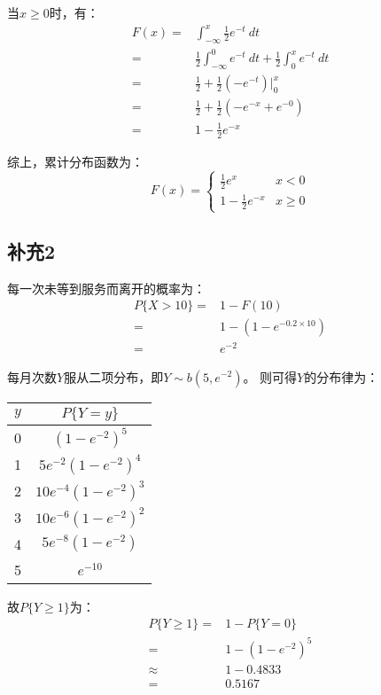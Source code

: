 \documentclass[a4paper,12pt]{ctexart}
\begin{document}
当$x \geq 0$时，有：
\begin{align*}
	F(x) =& \int_{-\infty}^{x} \frac{1}{2} e^{-t}\ dt\\
	=& \frac{1}{2} \int_{-\infty}^{0} e^{-t}\ dt + \frac{1}{2} \int_{0}^{x} e^{-t}\ dt\\
	=& \frac{1}{2} + \frac{1}{2} \left(-e^{-t}\right) \Big|_{0}^{x}\\
	=& \frac{1}{2} + \frac{1}{2} (-e^{-x} + e^{-0})\\
	=& 1 - \frac{1}{2} e^{-x}
\end{align*}

综上，累计分布函数为：
\begin{equation*}
	F(x) = \begin{cases}
		\frac{1}{2} e^{x} & x < 0\\
		1 - \frac{1}{2} e^{-x} & x \geq 0
	\end{cases}
\end{equation*}

\subsection*{补充2}

每一次未等到服务而离开的概率为：
\begin{align*}
	P\{X > 10\} =& 1 - F(10)\\
	=& 1 - (1 - e^{-0.2 \times 10})\\
	=& e^{-2}
\end{align*}

每月次数$Y$服从二项分布，即$Y \sim b(5, e^{-2})$。
则可得$Y$的分布律为：

\begin{center}
	\begin{tabular}{cc}
		\toprule
		$y$ & $P\{Y = y\}$\\
		\midrule
		0 & $(1-e^{-2})^5$\\
		1 & $5e^{-2}(1-e^{-2})^4$\\
		2 & $10e^{-4}(1-e^{-2})^3$\\
		3 & $10e^{-6}(1-e^{-2})^2$\\
		4 & $5e^{-8}(1-e^{-2})$\\
		5 & $e^{-10}$\\
		\bottomrule
	\end{tabular}
\end{center}

故$P\{Y \geq 1\}$为：
\begin{align*}
	P\{Y \geq 1\} =& 1 - P\{Y = 0\}\\
	=& 1 - (1-e^{-2})^5\\
	\approx& 1 - 0.4833\\
	=& 0.5167
\end{align*}
\end{document}
